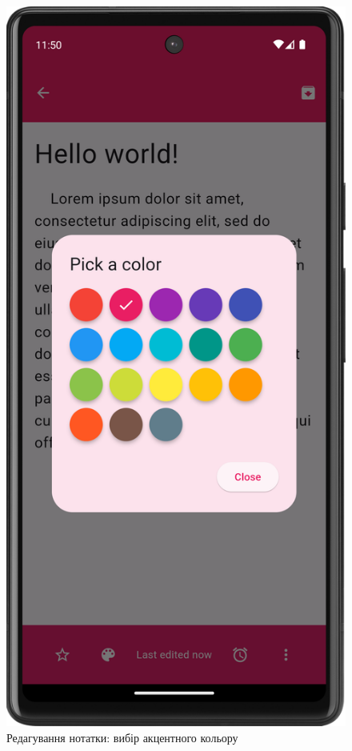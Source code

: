 \documentclass[oneside,14pt]{extarticle}
\begin{document}
\begin{normalsize}
\begin{figure}[H]
\begin{minipage}{0.48\textwidth}
		\end{minipage}\hfill
		\begin{minipage}{0.48\textwidth}
			\centering
			\includegraphics[scale=0.12]{4}
			\caption{Редагування нотатки: вибір акцентного кольору}
		\end{minipage}
	\end{figure}
	

\end{normalsize}
\end{document}
